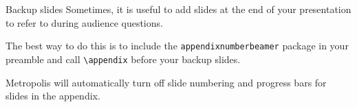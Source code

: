 \appendix %

\begin{frame}[fragile]{Backup slides}
	Sometimes, it is useful to add slides at the end of your presentation to
	refer to during audience questions.
	
	The best way to do this is to include the \verb|appendixnumberbeamer|
	package in your preamble and call \verb|\appendix| before your backup slides.
	
	Metropolis will automatically turn off slide numbering and progress bars for
	slides in the appendix.
\end{frame}